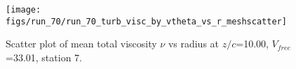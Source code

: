 \begin{figure}[H]
\centering
\texttt{[image: figs/run\_70/run\_70\_turb\_visc\_by\_vtheta\_vs\_r\_meshscatter]}
\caption{Scatter plot of mean total viscosity $\nu$ vs radius at $z/c$=10.00, $V_{free}$=33.01, station 7.}
\label{fig:run_70_turb_visc_by_vtheta_vs_r_meshscatter}
\end{figure}


